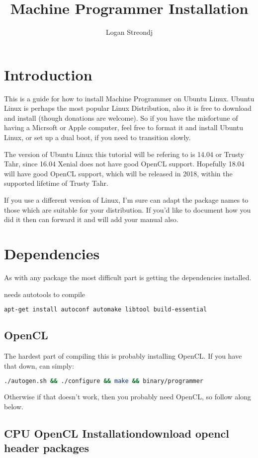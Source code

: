 \documentclass[12pt]{article}
\title{Machine Programmer Installation}
\author{Logan Streondj}
\begin{document}
\maketitle
\tableofcontents
\section{Introduction}
This is a guide for how to install Machine Programmer on Ubuntu Linux.
Ubuntu Linux is perhaps the most popular Linux Distribution,
also it is free to download and install (though donations are welcome).
So if you have the misfortune of having a Micrsoft or Apple computer, 
feel free to format it and install Ubuntu Linux,
or set up a dual boot, if you need to transition slowly.  

The version of Ubuntu Linux this tutorial will be refering to is 14.04 or
Trusty Tahr, since 16.04 Xenial does not have good OpenCL support. 
Hopefully 18.04 will have good OpenCL support, 
which will be released in 2018, within the supported lifetime of Trusty Tahr. 

If you use a different version of Linux, I'm sure can adapt the package names to
those which are suitable for your distribution.  If you'd like to document how
you did it then can forward it and will add your manual also.

\section{Dependencies}
As with any package the most difficult part is getting the dependencies
installed.

needs autotools to compile
\begin{lstlisting}[language=bash]
apt-get install autoconf automake libtool build-essential
\end{lstlisting}

\subsection{OpenCL}
The hardest part of compiling this is probably installing OpenCL.
If you have that down, can simply:
\begin{lstlisting}[language=bash]
./autogen.sh && ./configure && make && binary/programmer
\end{lstlisting}

Otherwise if that doesn't work, then you probably need OpenCL,
so follow along below.

\subsection{CPU OpenCL Installationdownload opencl header packages}
\end{document}
